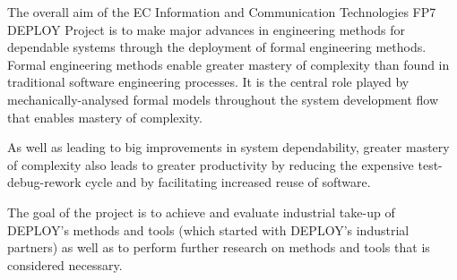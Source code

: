 \documentclass[12pt]{book}
\begin{document}
The overall aim of the EC Information and Communication Technologies FP7 DEPLOY Project is to make major advances in engineering methods for dependable systems through the deployment of formal engineering methods. Formal engineering methods enable greater mastery of complexity than found in traditional software engineering processes. It is the central role played by mechanically-analysed formal models throughout the system development flow that enables mastery of complexity.

As well as leading to big improvements in system dependability, greater mastery of complexity also leads to greater productivity by reducing the expensive test-debug-rework cycle and by facilitating increased reuse of software.

The goal of the project is to achieve and evaluate industrial take-up of DEPLOY's methods and tools (which started with DEPLOY's industrial partners) as well as to perform further research on methods and tools that is considered necessary.



% 







\clearpage
{}
{} 
\printindex
\end{document}
